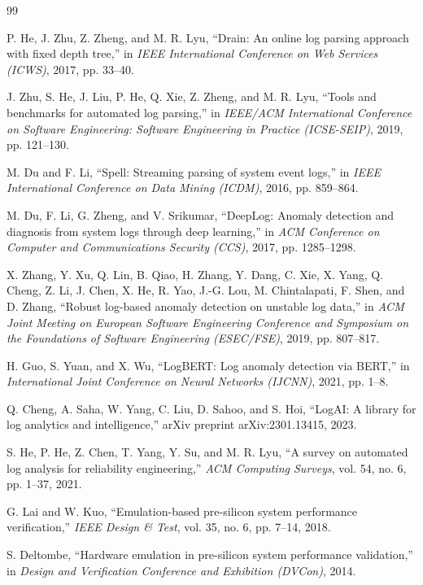 \documentclass[conference]{IEEEtran}
\begin{document}
\begin{thebibliography}{99}

P. He, J. Zhu, Z. Zheng, and M. R. Lyu, ``Drain: An online log parsing approach with fixed depth tree,'' in \textit{IEEE International Conference on Web Services (ICWS)}, 2017, pp. 33--40.

J. Zhu, S. He, J. Liu, P. He, Q. Xie, Z. Zheng, and M. R. Lyu, ``Tools and benchmarks for automated log parsing,'' in \textit{IEEE/ACM International Conference on Software Engineering: Software Engineering in Practice (ICSE-SEIP)}, 2019, pp. 121--130.

M. Du and F. Li, ``Spell: Streaming parsing of system event logs,'' in \textit{IEEE International Conference on Data Mining (ICDM)}, 2016, pp. 859--864.

M. Du, F. Li, G. Zheng, and V. Srikumar, ``DeepLog: Anomaly detection and diagnosis from system logs through deep learning,'' in \textit{ACM Conference on Computer and Communications Security (CCS)}, 2017, pp. 1285--1298.

X. Zhang, Y. Xu, Q. Lin, B. Qiao, H. Zhang, Y. Dang, C. Xie, X. Yang, Q. Cheng, Z. Li, J. Chen, X. He, R. Yao, J.-G. Lou, M. Chintalapati, F. Shen, and D. Zhang, ``Robust log-based anomaly detection on unstable log data,'' in \textit{ACM Joint Meeting on European Software Engineering Conference and Symposium on the Foundations of Software Engineering (ESEC/FSE)}, 2019, pp. 807--817.

H. Guo, S. Yuan, and X. Wu, ``LogBERT: Log anomaly detection via BERT,'' in \textit{International Joint Conference on Neural Networks (IJCNN)}, 2021, pp. 1--8.

Q. Cheng, A. Saha, W. Yang, C. Liu, D. Sahoo, and S. Hoi, ``LogAI: A library for log analytics and intelligence,'' arXiv preprint arXiv:2301.13415, 2023.

S. He, P. He, Z. Chen, T. Yang, Y. Su, and M. R. Lyu, ``A survey on automated log analysis for reliability engineering,'' \textit{ACM Computing Surveys}, vol. 54, no. 6, pp. 1--37, 2021.

G. Lai and W. Kuo, ``Emulation-based pre-silicon system performance verification,'' \textit{IEEE Design \& Test}, vol. 35, no. 6, pp. 7--14, 2018.

S. Deltombe, ``Hardware emulation in pre-silicon system performance validation,'' in \textit{Design and Verification Conference and Exhibition (DVCon)}, 2014.


\end{thebibliography}
\end{document}
